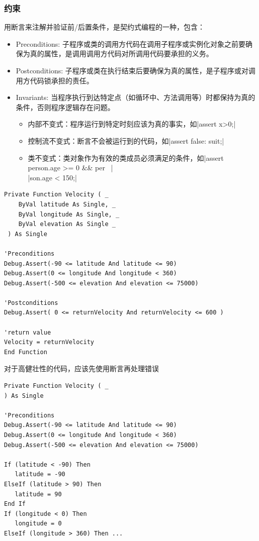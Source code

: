 \subsubsection{约束}
用断言来注解并验证前/后置条件，是契约式编程的一种，包含：
\begin{itemize}
    \item Preconditions: 子程序或类的调用方代码在调用子程序或实例化对象之前要确保为真的属性，是调用调用方代码对所调用代码要承担的义务。
    \item Postconditions: 子程序或类在执行结束后要确保为真的属性，是子程序或对调用方代码锁承担的责任。
    \item Invariants: 当程序执行到达特定点（如循环中、方法调用等）时都保持为真的条件，否则程序逻辑存在问题。
    \begin{itemize}
        \item 内部不变式：程序运行到特定时刻应该为真的事实，如\sverb|assert x>0;|
        \item 控制流不变式：断言不会被运行到的代码，如\sverb|assert false: suit;|
        \item 类不变式：类对象作为有效的类成员必须满足的条件，如\sverb|assert person.age >= 0 && per \ | \\\sverb|son.age < 150;|
    \end{itemize}
\end{itemize}

\begin{lstlisting}
Private Function Velocity ( _
    ByVal latitude As Single, _
    ByVal longitude As Single, _
    ByVal elevation As Single _
 ) As Single

'Preconditions
Debug.Assert(-90 <= latitude And latitude <= 90)
Debug.Assert(0 <= longitude And longitude < 360)
Debug.Assert(-500 <= elevation And elevation <= 75000)
 
'Postconditions
Debug.Assert( 0 <= returnVelocity And returnVelocity <= 600 )

'return value
Velocity = returnVelocity
End Function
\end{lstlisting}

对于高健壮性的代码，应该先使用断言再处理错误
\begin{lstlisting}
Private Function Velocity ( _
) As Single

'Preconditions
Debug.Assert(-90 <= latitude And latitude <= 90)
Debug.Assert(0 <= longitude And longitude < 360)
Debug.Assert(-500 <= elevation And elevation <= 75000)

If (latitude < -90) Then
   latitude = -90
ElseIf (latitude > 90) Then
   latitude = 90
End If
If (longitude < 0) Then
   longitude = 0
ElseIf (longitude > 360) Then ...
\end{lstlisting}

